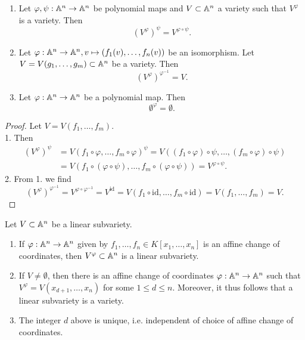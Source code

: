\begin{lemma}\label{TechnicalLemmasAboutPreimagesOfPolynomialMaps}
    \begin{enumerate}
    \item Let $\varphi,\psi: \mathbb{A}^n\rightarrow \mathbb{A}^n$ be polynomial maps and $V\subset \mathbb{A}^n$ a variety such that $V^\varphi$ is a variety. Then $$\left(V^{\varphi}\right)^{\psi} = V^{\varphi\circ \psi}.$$
    \item Let $\varphi : \mathbb{A}^n \rightarrow \mathbb{A}^n,v\mapsto (f_1(v),\dots,f_n(v))$ be an isomorphism. Let $V=V(g_1,\dots,g_m)\subset \mathbb{A}^n$ be a variety. Then 
    $$\left(V^{\varphi}\right)^{{\varphi}^{-1}} = V.$$
    \item Let $\varphi: \mathbb{A}^n\rightarrow \mathbb{A}^n$ be a polynomial map. Then
    $$\emptyset^\varphi = \emptyset.$$
    \end{enumerate}
\end{lemma}
\begin{proof}
     Let $V=V(f_1,\dots,f_m)$.\\ 
     1. Then 
    \begin{align*} 
        \left(V^{\varphi}\right)^{\psi} &= V(f_1\circ \varphi,\dots, f_m\circ \varphi)^\psi = V((f_1\circ\varphi)\circ \psi,\dots,(f_m\circ \varphi)\circ \psi)\\ 
        &= V(f_1\circ(\varphi\circ \psi),\dots, f_m\circ(\varphi\circ \psi)) = V^{\varphi\circ \psi}.
    \end{align*}
    2. From 1. we find $$\left(V^{\varphi}\right)^{{\varphi}^{-1}}=V^{\varphi\circ\varphi^{-1}}=V^{\mathrm{id}}=V(f_1\circ \mathrm{id},\dots,f_m\circ \mathrm{id})=V(f_1,\dots,f_m)=V.$$
\end{proof}
\begin{proposition}\label{AffineLinearDimension}
    Let $V\subset \mathbb{A}^n$ be a linear subvariety.
    \begin{enumerate}
        \item If $\varphi: \mathbb{A}^n \rightarrow \mathbb{A}^n$ given by $f_1,\dots,f_n\in K[x_1,\dots,x_n]$ is an affine change of coordinates, then $V^\varphi\subset \mathbb{A}^n$ is a linear subvariety.
        \item If $V\neq \emptyset$, then there is an affine change of coordinates $\varphi: \mathbb{A}^n \rightarrow \mathbb{A}^n$ such that $V^\varphi = V(x_{d+1},\dots,x_{n})$ for some $1\leq d\leq n$. Moreover, it thus follows that a linear subvariety is a variety.  
        \item The integer $d$ above is unique, i.e. independent of choice of affine change of coordinates.
    \end{enumerate}
\end{proposition}

